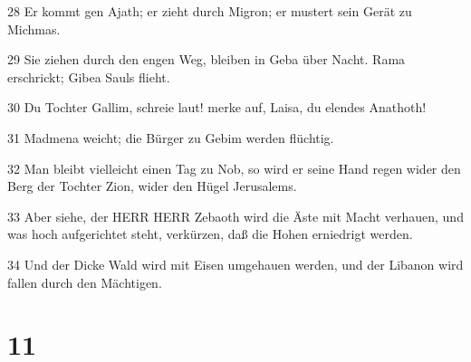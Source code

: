 \par 28 Er kommt gen Ajath; er zieht durch Migron; er mustert sein Gerät zu Michmas.
\par 29 Sie ziehen durch den engen Weg, bleiben in Geba über Nacht. Rama erschrickt; Gibea Sauls flieht.
\par 30 Du Tochter Gallim, schreie laut! merke auf, Laisa, du elendes Anathoth!
\par 31 Madmena weicht; die Bürger zu Gebim werden flüchtig.
\par 32 Man bleibt vielleicht einen Tag zu Nob, so wird er seine Hand regen wider den Berg der Tochter Zion, wider den Hügel Jerusalems.
\par 33 Aber siehe, der HERR HERR Zebaoth wird die Äste mit Macht verhauen, und was hoch aufgerichtet steht, verkürzen, daß die Hohen erniedrigt werden.
\par 34 Und der Dicke Wald wird mit Eisen umgehauen werden, und der Libanon wird fallen durch den Mächtigen.

\chapter{11}


